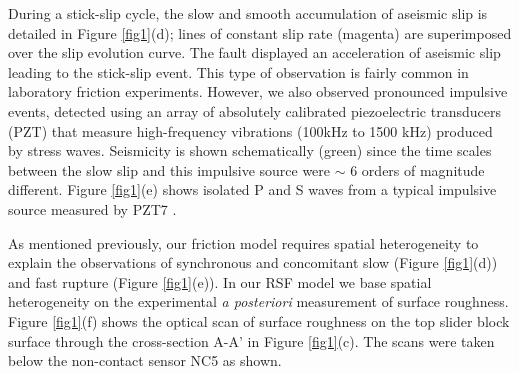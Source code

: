 \documentclass[preprint,1p, 10pt,authoryear]{elsarticle}
\begin{document}
During a stick-slip cycle, the slow and smooth accumulation of aseismic slip is detailed in Figure \ref{fig1}(d); lines of constant slip rate (magenta) are superimposed over the slip evolution curve.  The fault displayed an acceleration of aseismic slip leading to the stick-slip event. This type of observation is fairly common in laboratory friction experiments. However, we also observed pronounced impulsive events, detected using an array of absolutely calibrated piezoelectric transducers (PZT) that measure high-frequency vibrations (100kHz to 1500 kHz) produced by stress waves. Seismicity is shown schematically (green) since the time scales between the slow slip and this impulsive source were $\sim$ 6 orders of magnitude different.  Figure \ref{fig1}(e) shows isolated P and S waves from a typical impulsive source measured by PZT7  \citep{Selvadurai2019}.
 
As mentioned previously, our friction model requires spatial heterogeneity to explain the observations of synchronous and concomitant slow (Figure \ref{fig1}(d)) and fast rupture (Figure \ref{fig1}(e)). In our RSF model we base spatial heterogeneity  on the experimental \textit{a posteriori} measurement of surface roughness. Figure \ref{fig1}(f) shows the optical scan of surface roughness on the top slider block surface through the cross-section A-A' in Figure \ref{fig1}(c).  The scans were taken below the non-contact sensor NC5 as shown.
\end{document}
